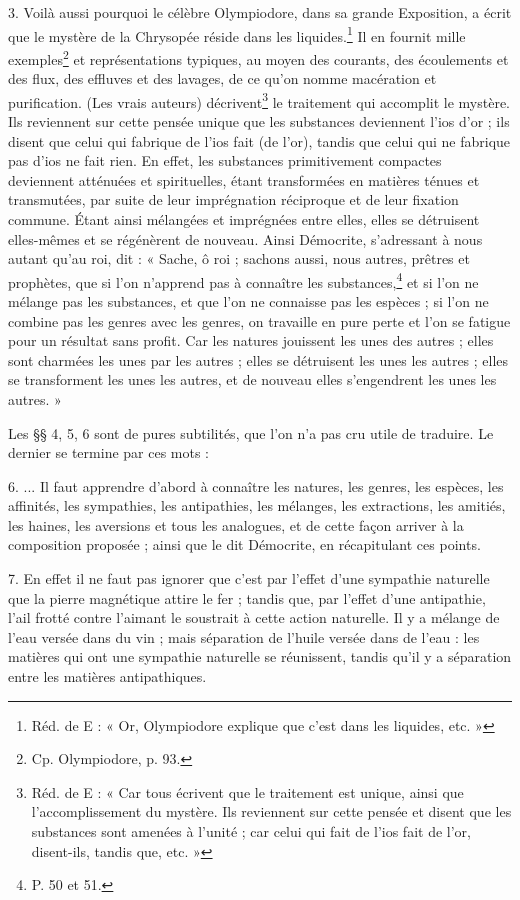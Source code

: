 \documentclass[a4paper, 11pt, oneside, polutonikogreek, french]{article}
\begin{document}
3. Voilà aussi pourquoi le célèbre Olympiodore, dans sa grande Exposition, a écrit que le mystère de la Chrysopée réside dans les liquides.\footnote{Réd. de E : « Or, Olympiodore explique que c'est dans les liquides, etc. »} Il en fournit mille exemples\footnote{Cp. Olympiodore, p. 93.} et représentations typiques, au moyen des courants, des écoulements et des flux, des effluves et des lavages, de ce qu'on nomme macération et purification. (Les vrais auteurs) décrivent\footnote{Réd. de E : « Car tous écrivent que le traitement est unique, ainsi que l'accomplissement du mystère. Ils reviennent sur cette pensée et disent que les substances sont amenées à l'unité ; car celui qui fait de l'ios fait de l'or, disent-ils, tandis que, etc. »} le traitement qui accomplit le mystère. Ils reviennent sur cette pensée unique que les substances deviennent l'ios d'or ; ils disent que celui qui fabrique de l'ios fait (de l'or), tandis que celui qui ne fabrique pas d'ios ne fait rien. En effet, les substances primitivement compactes deviennent atténuées et spirituelles, étant transformées en matières ténues et transmutées, par suite de leur imprégnation réciproque et de leur fixation commune. Étant ainsi mélangées et imprégnées entre elles, elles se détruisent elles-mêmes et se régénèrent de nouveau. Ainsi Démocrite, s'adressant à nous autant qu'au roi, dit : « Sache, ô roi ; sachons aussi, nous autres, prêtres et prophètes, que si l'on n'apprend pas à connaître les substances,\footnote{P. 50 et 51.} et si l'on ne mélange pas les substances, et que l'on ne connaisse pas les espèces ; si l'on ne combine pas les genres avec les genres, on travaille en pure perte et l'on se fatigue pour un résultat sans profit. Car les natures jouissent les unes des autres ; elles sont charmées les unes par les autres ; elles se détruisent les unes les autres ; elles se transforment les unes les autres, et de nouveau elles s'engendrent les unes les autres. »

Les §§ 4, 5, 6 sont de pures subtilités, que l'on n'a pas cru utile de traduire. Le dernier se termine par ces mots :

6. ... Il faut apprendre d'abord à connaître les natures, les genres, les espèces, les affinités, les sympathies, les antipathies, les mélanges, les extractions, les amitiés, les haines, les aversions et tous les analogues, et de cette façon arriver à la composition proposée ; ainsi que le dit Démocrite, en récapitulant ces points.

7. En effet il ne faut pas ignorer que c'est par l'effet d'une sympathie naturelle que la pierre magnétique attire le fer ; tandis que, par l'effet d'une antipathie, l'ail frotté contre l'aimant le soustrait à cette action naturelle. Il y a mélange de l'eau versée dans du vin ; mais séparation de l'huile versée dans de l'eau : les matières qui ont une sympathie naturelle se réunissent, tandis qu'il y a séparation entre les matières antipathiques.
\end{document}
